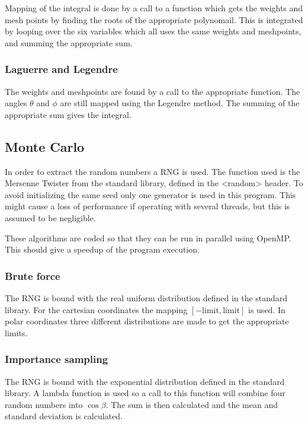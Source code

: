 \documentclass[11pt,a4paper,english,final]{article}
\numberwithin{equation}{section}
\begin{document}
Mapping of the integral is done by a call to a function which gets the 
weights and mesh points by finding the roots of the appropriate 
polynomail. This is integrated by looping over the six 
variables which all uses the same weights and meshpoints, and summing 
the appropriate sum.

\subsubsection{Laguerre and Legendre}

The weights and meshpoints are found by 
a call to the appropriate function. The angles $\theta$ and $\phi$
are still mapped using 
the Legendre method. The summing of the appropriate sum gives the 
integral.


\subsection{Monte Carlo}

In order to extract the random numbers a RNG is used. The function used 
is the Mersenne Twister from the standard library, defined in the 
<random> header. To avoid initializing the same seed only one generator 
is used in this program. This might cause a loss of performance 
if operating with several threads, but this is assumed to be 
negligible.

These algorithms are coded so that they can be run in parallel using 
OpenMP. This should give a speedup of the program execution.


\subsubsection{Brute force}

The RNG is bound with the real uniform distribution defined in the 
standard library. For the cartesian coordinates the mapping 
$[-\mathrm{limit}, \mathrm{limit}]$ is used. In polar coordinates
three different distributions are made to get the appropriate 
limits.



\subsubsection{Importance sampling}

The RNG is bound with the exponential distribution defined in the 
standard library. A lambda function is used so a call to this function 
will combine four random numbers into $\cos\beta$. The sum is then 
calculated and the mean and standard deviation is calculated.
\end{document}

